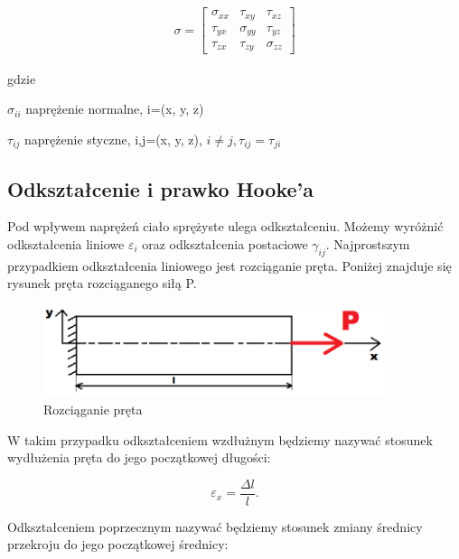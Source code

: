 \begin{gather}
	\sigma=\begin{bmatrix} 
	  \sigma_{xx}    & \tau_{xy} & \tau_{xz} \\ 
	  \tau_{yx} & \sigma_{yy} & \tau_{yz} \\
	  \tau_{zx} & \tau_{zy} & \sigma_{zz} 
	\end{bmatrix}
\end{gather}

gdzie

\begin{eqwhere}[2cm]
        \item[$\sigma_{ii}$] naprężenie normalne, i=(x, y, z)
        \item[$\tau_{ij}$] naprężenie styczne, i,j=(x, y, z), \( i \neq j, \tau_{ij}=\tau_{ji}\)
\end{eqwhere}

\subsection{Odkształcenie i prawko Hooke'a}
\label{sec:odksztalcenie_i_prawo_hookea}

	Pod wpływem naprężeń ciało sprężyste ulega odkształceniu. Możemy wyróżnić odkształcenia liniowe \( \varepsilon_i \) oraz odkształcenia postaciowe \( \gamma_{ij} \). Najprostszym przypadkiem odkształcenia liniowego jest rozciąganie pręta. Poniżej znajduje się rysunek pręta rozciąganego siłą P. 

\begin{figure}[h]
\centering
\includegraphics[width=10cm]{Zdjecia/2/rozciaganie}
\caption{Rozciąganie pręta}
\label{fig:rozciaganie}
\end{figure}

	W takim przypadku odkształceniem wzdłużnym będziemy nazywać stosunek wydłużenia pręta do jego początkowej długości:

\begin{equation}
\varepsilon_x=\frac{\Delta l}{l}.
\end{equation}
	
	Odkształceniem poprzecznym nazywać będziemy stosunek zmiany średnicy przekroju do jego początkowej średnicy:

